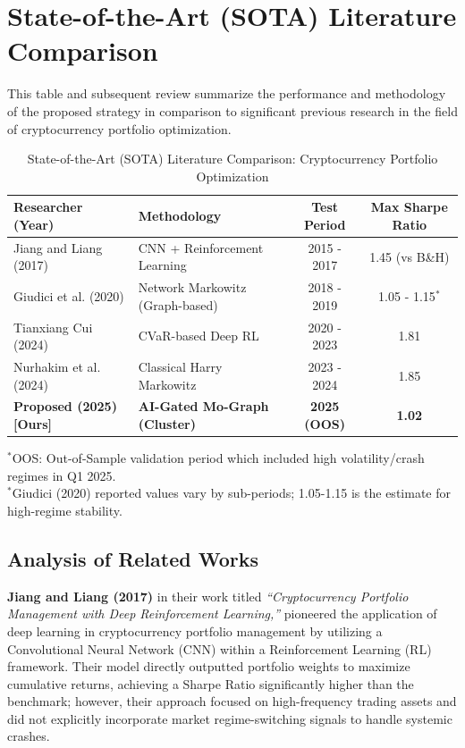 \documentclass[12pt, a4paper]{article}
\begin{document}
\section*{State-of-the-Art (SOTA) Literature Comparison}

This table and subsequent review summarize the performance and methodology of the proposed strategy in comparison to significant previous research in the field of cryptocurrency portfolio optimization.

\begin{table}[ht!]
\centering
\caption{State-of-the-Art (SOTA) Literature Comparison: Cryptocurrency Portfolio Optimization}
\label{tab:sota_literature}
\begin{tabular}{@{}llcc@{}}
\toprule
\textbf{Researcher (Year)} & \textbf{Methodology} & \textbf{Test Period} & \textbf{Max Sharpe Ratio} \\ \midrule
Jiang and Liang (2017) & CNN + Reinforcement Learning & 2015 - 2017 & 1.45 (vs B\&H) \\
Giudici et al. (2020) & Network Markowitz (Graph-based) & 2018 - 2019 & 1.05 - 1.15$^*$ \\
Tianxiang Cui (2024) & CVaR-based Deep RL & 2020 - 2023 & 1.81 \\
Nurhakim et al. (2024) & Classical Harry Markowitz & 2023 - 2024 & 1.85 \\
\textbf{Proposed (2025) [Ours]} & \textbf{AI-Gated Mo-Graph (Cluster)} & \textbf{2025 (OOS)} & \textbf{1.02} \\ \bottomrule
\end{tabular}

\vspace{2mm}
\footnotesize{$^*$OOS: Out-of-Sample validation period which included high volatility/crash regimes in Q1 2025.}\\
\footnotesize{$^*$Giudici (2020) reported values vary by sub-periods; 1.05-1.15 is the estimate for high-regime stability.}
\end{table}

\subsection*{Analysis of Related Works}

\textbf{Jiang and Liang (2017)} in their work titled \textit{``Cryptocurrency Portfolio Management with Deep Reinforcement Learning,''} pioneered the application of deep learning in cryptocurrency portfolio management by utilizing a Convolutional Neural Network (CNN) within a Reinforcement Learning (RL) framework. Their model directly outputted portfolio weights to maximize cumulative returns, achieving a Sharpe Ratio significantly higher than the benchmark; however, their approach focused on high-frequency trading assets and did not explicitly incorporate market regime-switching signals to handle systemic crashes.
\end{document}

